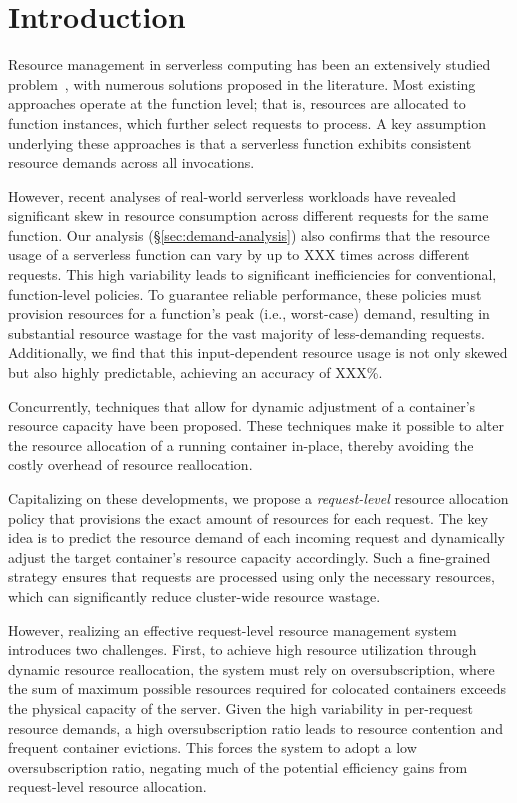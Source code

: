 \section{Introduction}
\label{sec:introduction}


Resource management in serverless computing has been an extensively studied problem~\cite{FaaSCache_ASPLOS21}, with numerous solutions proposed in the literature.
Most existing approaches operate at the function level; that is, resources are allocated to function instances, which further select requests to process.
A key assumption underlying these approaches is that a serverless function exhibits consistent resource demands across all invocations.

However, recent analyses of real-world serverless workloads have revealed significant skew in resource consumption across different requests for the same function.
Our analysis (\S\ref{sec:demand-analysis}) also confirms that the resource usage of a serverless function can vary by up to XXX times across different requests.
This high variability leads to significant inefficiencies for conventional, function-level policies.
To guarantee reliable performance, these policies must provision resources for a function's peak (i.e., worst-case) demand, resulting in substantial resource wastage for the vast majority of less-demanding requests. 
Additionally, we find that this input-dependent resource usage is not only skewed but also highly predictable, achieving an accuracy of XXX\%.

Concurrently, techniques that allow for dynamic adjustment of a container's resource capacity have been proposed.
These techniques make it possible to alter the resource allocation of a running container in-place, thereby avoiding the costly overhead of resource reallocation.

Capitalizing on these developments, we propose a \textit{request-level} resource allocation policy that provisions the exact amount of resources for each request.
The key idea is to predict the resource demand of each incoming request and dynamically adjust the target container's resource capacity accordingly.
Such a fine-grained strategy ensures that requests are processed using only the necessary resources, which can significantly reduce cluster-wide resource wastage.

However, realizing an effective request-level resource management system introduces two challenges.
First, to achieve high resource utilization through dynamic resource reallocation, the system must rely on oversubscription,
where the sum of maximum possible resources required for colocated containers exceeds the physical capacity of the server.
Given the high variability in per-request resource demands, a high oversubscription ratio leads to resource contention and frequent container evictions.
This forces the system to adopt a low oversubscription ratio, negating much of the potential efficiency gains from request-level resource allocation.

